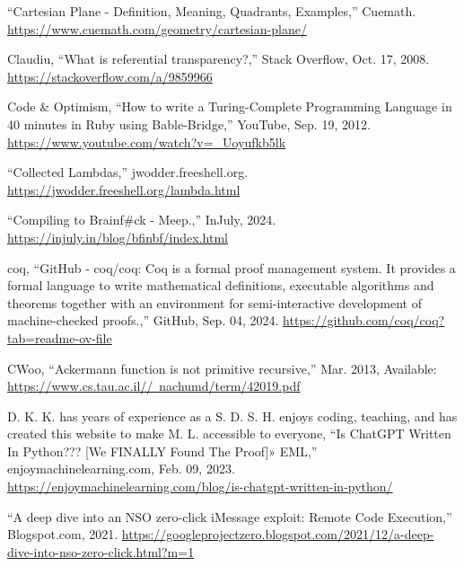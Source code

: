 \documentclass[12pt]{report} %
\begin{document}
\begin{singlespace}
\begin{thebibliography}{}
             “Cartesian Plane - Definition, Meaning, Quadrants, Examples,” Cuemath. \href{https://www.cuemath.com/geometry/cartesian-plane/}{https://www.cuemath.com/geometry/cartesian-plane/}
            
             Claudiu, “What is referential transparency?,” Stack Overflow, Oct. 17, 2008. \href{https://stackoverflow.com/a/9859966}{https://stackoverflow.com/a/9859966}
            
             Code \& Optimism, “How to write a Turing-Complete Programming Language in 40 minutes in Ruby using Bable-Bridge,” YouTube, Sep. 19, 2012. \href{https://www.youtube.com/watch?v=_Uoyufkb5lk}{https://www.youtube.com/watch?v=\_Uoyufkb5lk}
            
             “Collected Lambdas,” jwodder.freeshell.org. \href{https://jwodder.freeshell.org/lambda.html}{https://jwodder.freeshell.org/lambda.html}
            
             “Compiling to Brainf\#ck - Meep.,” InJuly, 2024. \href{https://injuly.in/blog/bfinbf/index.html}{https://injuly.in/blog/bfinbf/index.html}
            
             coq, “GitHub - coq/coq: Coq is a formal proof management system. It provides a formal language to write mathematical definitions, executable algorithms and theorems together with an environment for semi-interactive development of machine-checked proofs.,” GitHub, Sep. 04, 2024. \href{https://github.com/coq/coq?tab=readme-ov-file}{https://github.com/coq/coq?tab=readme-ov-file}
            
             CWoo, “Ackermann function is not primitive recursive,” Mar. 2013, Available: \href{https://www.cs.tau.ac.il//~nachumd/term/42019.pdf}{https://www.cs.tau.ac.il//~nachumd/term/42019.pdf}
            
             D. K. K. has years of experience as a S. D. S. H. enjoys coding, teaching, and has created this website to make M. L. accessible to everyone, “Is ChatGPT Written In Python??? [We FINALLY Found The Proof]» EML,” enjoymachinelearning.com, Feb. 09, 2023. \href{https://enjoymachinelearning.com/blog/is-chatgpt-written-in-python/}{https://enjoymachinelearning.com/blog/is-chatgpt-written-in-python/}
            
             “A deep dive into an NSO zero-click iMessage exploit: Remote Code Execution,” Blogspot.com, 2021. \href{https://googleprojectzero.blogspot.com/2021/12/a-deep-dive-into-nso-zero-click.html?m=1}{https://googleprojectzero.blogspot.com/2021/12/a-deep-dive-into-nso-zero-click.html?m=1}
            

\end{thebibliography}
\end{singlespace}
\end{document}

